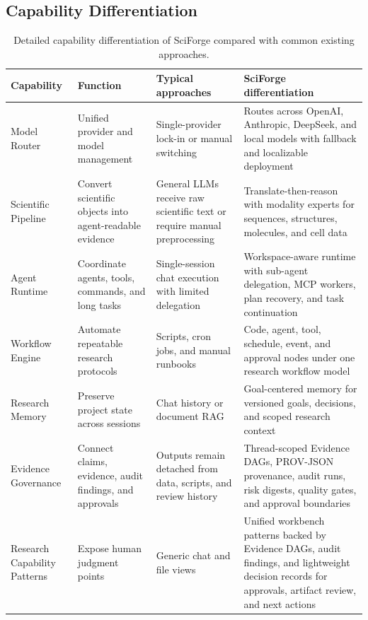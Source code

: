 \documentclass[sn-basic,Numbered,pdflatex]{sn-jnl}
\begin{document}
\clearpage
\begin{appendices}
\renewcommand{\theHtable}{A.\arabic{table}}

\section{Capability Differentiation}

\begin{table}[ht!]
\caption{Detailed capability differentiation of SciForge compared with common existing approaches.}
\label{tab:capability_differentiation}
\scriptsize
\centering
\setlength{\tabcolsep}{3pt}
\renewcommand{\arraystretch}{1.15}
\begin{tabular}{@{}L{2.2cm} L{2.7cm} L{3.0cm} L{3.5cm}@{}}
\toprule
\textbf{Capability} & \textbf{Function} & \textbf{Typical approaches} & \textbf{SciForge differentiation} \\
\midrule
Model Router
& Unified provider and model management
& Single-provider lock-in or manual switching
& Routes across OpenAI, Anthropic, DeepSeek, and local models with fallback and localizable deployment \\
Scientific Pipeline
& Convert scientific objects into agent-readable evidence
& General LLMs receive raw scientific text or require manual preprocessing
& Translate-then-reason with modality experts for sequences, structures, molecules, and cell data \\
Agent Runtime
& Coordinate agents, tools, commands, and long tasks
& Single-session chat execution with limited delegation
& Workspace-aware runtime with sub-agent delegation, MCP workers, plan recovery, and task continuation \\
Workflow Engine
& Automate repeatable research protocols
& Scripts, cron jobs, and manual runbooks
& Code, agent, tool, schedule, event, and approval nodes under one research workflow model \\
Research Memory
& Preserve project state across sessions
& Chat history or document RAG
& Goal-centered memory for versioned goals, decisions, and scoped research context \\
Evidence Governance
& Connect claims, evidence, audit findings, and approvals
& Outputs remain detached from data, scripts, and review history
& Thread-scoped Evidence DAGs, PROV-JSON provenance, audit runs, risk digests, quality gates, and approval boundaries \\
Research Capability Patterns
& Expose human judgment points
& Generic chat and file views
& Unified workbench patterns backed by Evidence DAGs, audit findings, and lightweight decision records for approvals, artifact review, and next actions \\
\bottomrule
\end{tabular}
\end{table}
\clearpage

\end{appendices}
\end{document}
